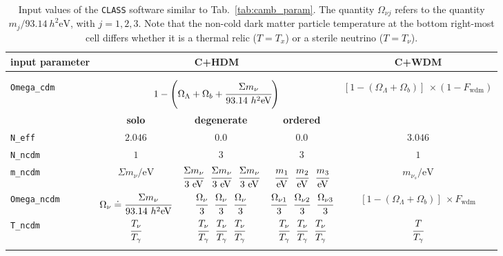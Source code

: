 \begin{table}
	\begin{center}
	\begin{small}
		\begin{tabular}{lcccc}
			\textbf{input parameter} &  \multicolumn{3}{c}{\textbf{C+HDM}} & \textbf{C+WDM}\\[2pt]
			\hline \\[-10pt]
			\\[-10pt]
			 \texttt{Omega\_cdm} & \multicolumn{3}{c}{$1 - \left( \Omega_\Lambda + \Omega_b + \cfrac{\Sigma m_\nu}{93.14~h^2\mathrm{eV}} \right)$} & $\left[ 1 - (\Omega_\Lambda + \Omega_b) \right] ~ \times (1-F_{\mathrm{wdm}})$ \\[2pt]
			& \textbf{solo} & \textbf{degenerate} & \textbf{ordered} & \\[2pt]
			\texttt{N\_eff} & $2.046$ & $0.0$ & $0.0$ & $3.046$ \\[2pt]
			\texttt{N\_ncdm} & $1$ & $3$ & $3$ & $1$ \\[2pt]
			\texttt{m\_ncdm} & $\Sigma m_\nu / \mathrm{eV}$ & $\cfrac{\Sigma m_\nu}{3~\mathrm{eV}}~~\cfrac{\Sigma m_\nu}{3~\mathrm{eV}}~~\cfrac{\Sigma m_\nu}{3~\mathrm{eV}}$ & $\cfrac{m_1}{\mathrm{eV}}~~\cfrac{m_2}{\mathrm{eV}}~~\cfrac{m_3}{\mathrm{eV}}$ & $m_{\nu_s} / \mathrm{eV}$ \\[2pt]
			\texttt{Omega\_ncdm} & $\Omega_\nu \doteq \cfrac{\Sigma m_\nu}{93.14~h^2\mathrm{eV}}$ & $\cfrac{\Omega_\nu}{3}~~\cfrac{\Omega_\nu}{3}~~\cfrac{\Omega_\nu}{3}$ & $\cfrac{\Omega_{\nu 1}}{3}~~\cfrac{\Omega_{\nu 2}}{3}~~\cfrac{\Omega_{\nu 3}}{3}$ & $\left[ 1 - (\Omega_\Lambda + \Omega_b) \right] ~ \times F_{\mathrm{wdm}}$ \\[2pt]
			\texttt{T\_ncdm} & $\cfrac{T_\nu}{T_\gamma}$ & $\cfrac{T_\nu}{T_\gamma}~~\cfrac{T_\nu}{T_\gamma}~~\cfrac{T_\nu}{T_\gamma}$ & $\cfrac{T_\nu}{T_\gamma}~~\cfrac{T_\nu}{T_\gamma}~~\cfrac{T_\nu}{T_\gamma}$ & $\cfrac{T}{T_\gamma}$ \\[2pt]				
			\hline \\[-10pt]
		\end{tabular}
	\end{small}
	\end{center}
	\caption{Input values of the \texttt{CLASS} software similar to Tab.~\ref{tab:camb_param}. The quantity $\Omega_{\nu j}$ refers to the quantity $m_j / 93.14~h^2\mathrm{eV}$, with $j=1,2,3$. Note that the non-cold dark matter particle temperature at the bottom right-most cell differs whether it is a thermal relic ($T = T_x$) or a sterile neutrino ($T = T_\nu$).}
	\label{tab:class_param}
\end{table}


